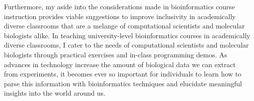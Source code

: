 \begin{dissertationepilogue}
    Furthermore, my aside into the considerations made in bioinformatics course instruction provides viable suggestions to improve inclusivity in academically diverse classrooms that are a melange of computational scientists and molecular biologists alike. In teaching university-level bioinformatics courses in academically diverse classrooms, I cater to the needs of computational scientists and molecular biologists through practical exercises and in-class programming demos. As advances in technology increase the amount of biological data we can extract from experiments, it becomes ever so important for individuals to learn how to parse this information with bioinformatics techniques and elucidate meaningful insights into the world around us. 

\end{dissertationepilogue}